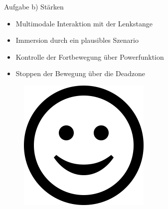 \documentclass{beamer}
\begin{document}
\begin{frame}{Aufgabe b) Stärken}
\begin{minipage}[c]{0.72\textwidth}
\begin{itemize}
\item Multimodale Interaktion mit der Lenkstange
\item Immersion durch ein plausibles Szenario
\item Kontrolle der Fortbewegung über Powerfunktion
\item Stoppen der Bewegung über die Deadzone
\end{itemize}
\end{minipage}
\hfill
\begin{minipage}[c]{0.25\textwidth}
\begin{figure}
\centering
\includegraphics[width=\textwidth, keepaspectratio]{img/smile}
\caption{\cite{smiley}}
\end{figure}
\end{minipage}
\end{frame}
\end{document}
